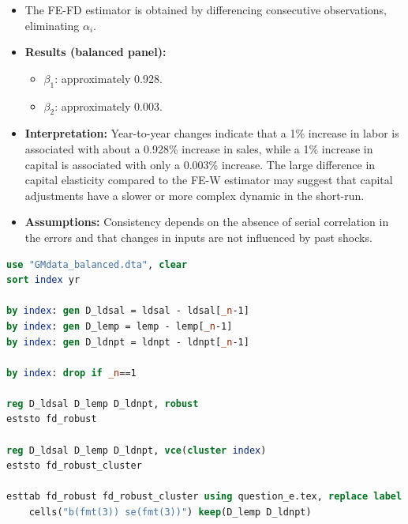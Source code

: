 \documentclass[a4paper,12pt]{article} %
\theoremstyle{nonitalic}
\newenvironment{solution}[1]
  {\renewcommand\theinnercustomsol{#1}\innercustomsol}
  {\endinnercustomsol}
\newcounter{solutionctr}
\renewcommand{\thesolutionctr}{(\alph{solutionctr})}
\newenvironment{autosolution}
  {\stepcounter{solutionctr}\begin{solution}{\thesolutionctr}}
  {\end{solution}}
\begin{document}
\begin{autosolution}
\begin{itemize}
    \item The FE-FD estimator is obtained by differencing consecutive observations, eliminating $\alpha_i$.
    \item \textbf{Results (balanced panel):}
    
    \begin{itemize}
        \item $\beta_1$: approximately 0.928.
        \item $\beta_2$: approximately 0.003.
    \end{itemize}
    \item \textbf{Interpretation:} Year-to-year changes indicate that a 1\% increase in labor is associated with about a 0.928\% increase in sales, while a 1\% increase in capital is associated with only a 0.003\% increase. The large difference in capital elasticity compared to the FE-W estimator may suggest that capital adjustments have a slower or more complex dynamic in the short-run.
    \item \textbf{Assumptions:} Consistency depends on the absence of serial correlation in the errors and that changes in inputs are not influenced by past shocks.
\end{itemize}
\begin{lstlisting}[language=stata]
use "GMdata_balanced.dta", clear
sort index yr
    
by index: gen D_ldsal = ldsal - ldsal[_n-1]
by index: gen D_lemp = lemp - lemp[_n-1]
by index: gen D_ldnpt = ldnpt - ldnpt[_n-1]
    
by index: drop if _n==1

reg D_ldsal D_lemp D_ldnpt, robust
eststo fd_robust
    
reg D_ldsal D_lemp D_ldnpt, vce(cluster index)
eststo fd_robust_cluster
    
esttab fd_robust fd_robust_cluster using question_e.tex, replace label booktabs title("Question (e): Fixed Effects (FD) Estimator") ///
    cells("b(fmt(3)) se(fmt(3))") keep(D_lemp D_ldnpt)    
\end{lstlisting}
\end{autosolution}
\end{document}
